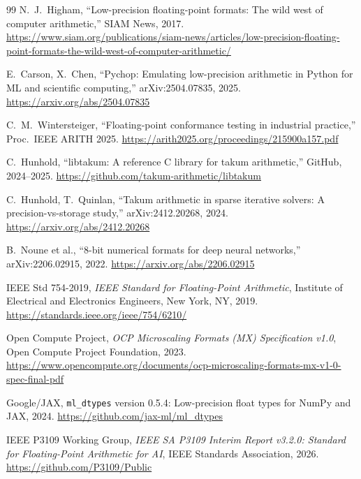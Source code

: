 \documentclass[11pt,letterpaper]{article}
\begin{document}
\begin{thebibliography}{99}
N.~J.~Higham,
``Low-precision floating-point formats: The wild west of computer arithmetic,''
SIAM News, 2017.
\url{https://www.siam.org/publications/siam-news/articles/low-precision-floating-point-formats-the-wild-west-of-computer-arithmetic/}

E.~Carson, X.~Chen,
``Pychop: Emulating low-precision arithmetic in Python for ML and scientific computing,''
arXiv:2504.07835, 2025.
\url{https://arxiv.org/abs/2504.07835}

C.~M.~Wintersteiger,
``Floating-point conformance testing in industrial practice,''
Proc.~IEEE ARITH 2025.
\url{https://arith2025.org/proceedings/215900a157.pdf}

C.~Hunhold,
``libtakum: A reference C library for takum arithmetic,''
GitHub, 2024--2025.
\url{https://github.com/takum-arithmetic/libtakum}

C.~Hunhold, T.~Quinlan,
``Takum arithmetic in sparse iterative solvers: A precision-vs-storage study,''
arXiv:2412.20268, 2024.
\url{https://arxiv.org/abs/2412.20268}

B.~Noune et al.,
``8-bit numerical formats for deep neural networks,''
arXiv:2206.02915, 2022.
\url{https://arxiv.org/abs/2206.02915}

IEEE Std 754-2019,
\emph{IEEE Standard for Floating-Point Arithmetic},
Institute of Electrical and Electronics Engineers, New York, NY, 2019.
\url{https://standards.ieee.org/ieee/754/6210/}

Open Compute Project,
\emph{OCP Microscaling Formats (MX) Specification v1.0},
Open Compute Project Foundation, 2023.
\url{https://www.opencompute.org/documents/ocp-microscaling-formats-mx-v1-0-spec-final-pdf}

Google/JAX,
\texttt{ml\_dtypes} version 0.5.4: Low-precision float types for NumPy and JAX,
2024.
\url{https://github.com/jax-ml/ml_dtypes}

IEEE P3109 Working Group,
\emph{IEEE SA P3109 Interim Report v3.2.0: Standard for Floating-Point Arithmetic
for AI}, IEEE Standards Association, 2026.
\url{https://github.com/P3109/Public}

\end{thebibliography}
\end{document}
